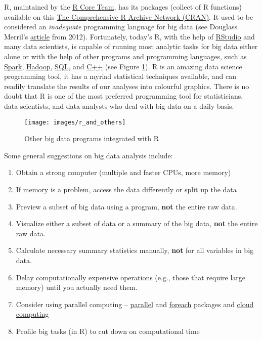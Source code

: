 \documentclass[]{book}
\begin{document}
R, maintained by the \href{https://www.r-project.org/contributors.html}{R Core Team}, has its packages (collect of R functions) available on this \href{https://cran.r-project.org/}{The Comprehensive R Archive Network (CRAN)}. It used to be considered an \emph{inadequate} programming language for big data (see Douglass Merril's \href{https://www.forbes.com/sites/douglasmerrill/2012/05/01/r-is-not-enough-for-big-data/\#59c7ad9b5924}{article} from 2012). Fortunately, today's R, with the help of \href{https://www.rstudio.com/}{RStudio} and many data scientists, is capable of running most analytic tasks for big data either alone or with the help of other programs and programming languages, such as \href{https://spark.apache.org/docs/latest/sparkr.html}{Spark}, \href{https://hadoop.apache.org/}{Hadoop}, \href{https://en.wikipedia.org/wiki/SQL}{SQL}, and \href{http://www.cplusplus.com/}{C++} (see Figure \ref{fig:fig1-2}). R is an amazing data science programming tool, it has a myriad statistical techniques available, and can readily translate the results of our analyses into colourful graphics. There is no doubt that R is one of the most preferred programming tool for statisticians, data scientists, and data analysts who deal with big data on a daily basis.

\begin{figure}
\texttt{[image: images/r\_and\_others]} \caption{Other big data programs integrated with R}\label{fig:fig1-2}
\end{figure}

Some general suggestions on big data analysis include:

\begin{enumerate}
\def\labelenumi{\arabic{enumi}.}
\item
  Obtain a strong computer (multiple and faster CPUs, more memory)
\item
  If memory is a problem, access the data differently or split up the data
\item
  Preview a subset of big data using a program, \textbf{not} the entire raw data.
\item
  Visualize either a subset of data or a summary of the big data, \textbf{not} the entire raw data.
\item
  Calculate necessary summary statistics manually, \textbf{not} for all variables in big data.
\item
  Delay computationally expensive operations (e.g., those that require large memory) until you actually need them.
\item
  Consider using parallel computing -- \href{https://stat.ethz.ch/R-manual/R-devel/library/parallel/doc/parallel.pdf}{parallel} and \href{https://cran.r-project.org/web/packages/foreach/vignettes/foreach.pdf}{foreach} packages and \href{https://rstudio.cloud/}{cloud computing}
\item
  Profile big tasks (in R) to cut down on computational time
\end{enumerate}
\end{document}
